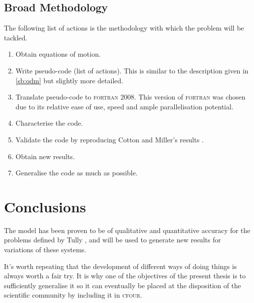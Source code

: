 \subsection{Broad Methodology}
%
The following list of actions is the methodology with which the problem will be tackled.
\begin{enumerate}
\item Obtain equations of motion.
\item Write pseudo-code (list of actions). This is similar to the description given in \cref{sb:qdm} but slightly more detailed.
\item Translate pseudo-code to \textsc{fortran 2008}. This version of \textsc{fortran} was chosen due to its relative ease of use, speed and ample parallelisation potential.
\item Characterise the code.
\item Validate the code by reproducing Cotton and Miller's results \cite{project}.
\item Obtain new results.
\item Generalise the code as much as possible.
\end{enumerate}
%
\section{Conclusions}\label{s:ic}
%
The model has been proven to be of qualitative and quantitative accuracy for the problems defined by Tully \cite{tully,project}, and will be used to generate new results for variations of these systems.

It's worth repeating that the development of different ways of doing things is always worth a fair try. It is why one of the objectives of the present thesis is to sufficiently generalise it so it can eventually be placed at the disposition of the scientific community by including it in \textsc{cfour}.

